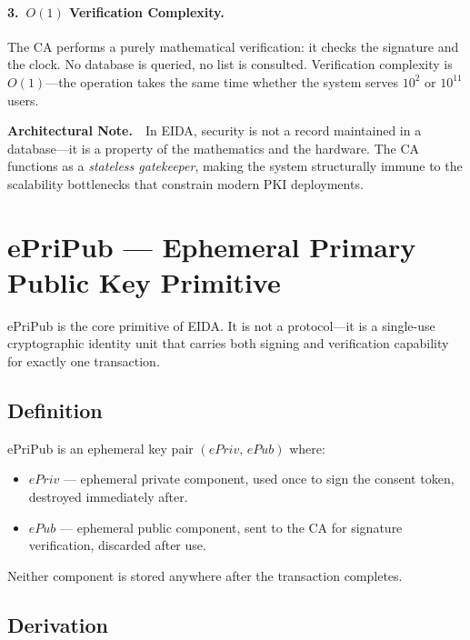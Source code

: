 \documentclass[11pt,a4paper]{article}
\begin{document}
\paragraph{3.~$O(1)$ Verification Complexity.}
The CA performs a purely mathematical verification: it checks the signature
and the clock.  No database is queried, no list is consulted.  Verification
complexity is $O(1)$---the operation takes the same time whether the system
serves $10^{2}$ or $10^{11}$ users.

\begin{archbox}
\textbf{Architectural Note.}~~In EIDA, security is not a record maintained in
a database---it is a property of the mathematics and the hardware.  The CA
functions as a \emph{stateless gatekeeper}, making the system structurally
immune to the scalability bottlenecks that constrain modern PKI deployments.
\end{archbox}

\section{ePriPub --- Ephemeral Primary Public Key Primitive}

ePriPub is the core primitive of EIDA.  It is not a protocol---it is a
single-use cryptographic identity unit that carries both signing and
verification capability for exactly one transaction.

\subsection{Definition}

ePriPub is an ephemeral key pair $(\mathit{ePriv},\,\mathit{ePub})$ where:
\begin{itemize}
  \item $\mathit{ePriv}$ --- ephemeral private component, used once to sign
        the consent token, destroyed immediately after.
  \item $\mathit{ePub}$ --- ephemeral public component, sent to the CA for
        signature verification, discarded after use.
\end{itemize}
Neither component is stored anywhere after the transaction completes.

\subsection{Derivation}
\end{document}

